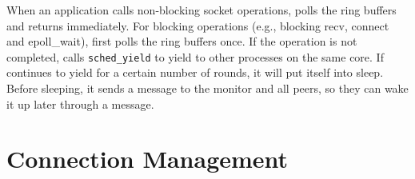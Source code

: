When an application calls non-blocking socket operations, \libipc{} polls the ring buffers and returns immediately. For blocking operations (e.g., blocking recv, connect and epoll\_wait), \libipc{} first polls the ring buffers once. If the operation is not completed, \libipc{} calls \texttt{sched\_yield} to yield to other processes on the same core. %
If \libipc{} continues to yield for a certain number of rounds, it will put itself into sleep. Before sleeping, it sends a message to the monitor and all peers, so they can wake it up later through a message.




\section{Connection Management}
\label{subsec:connection-management}


